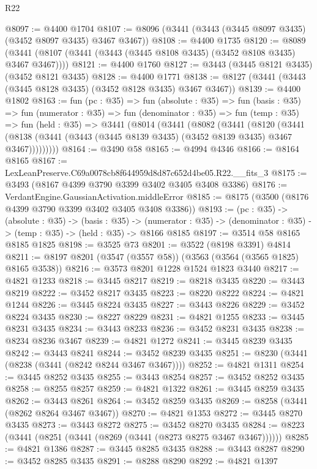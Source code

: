 \begin{lexlean}{R22}
\begin{coremodule}
@8097 := @4400 @1704
@8107 := @8096 (@3441 (@3443 (@3445 @8097 @3435) (@3452 @8097 @3435) @3467 @3467))
@8108 := @4400 @1735
@8120 := @8089 (@3441 (@8107 (@3441 (@3443 (@3445 @8108 @3435) (@3452 @8108 @3435) @3467 @3467))))
@8121 := @4400 @1760
@8127 := @3443 (@3445 @8121 @3435) (@3452 @8121 @3435)
@8128 := @4400 @1771
@8138 := @8127 (@3441 (@3443 (@3445 @8128 @3435) (@3452 @8128 @3435) @3467 @3467))
@8139 := @4400 @1802
@8163 := fun (pc : @35) =>
  fun (absolute : @35) =>
  fun (basis : @35) =>
  fun (numerator : @35) =>
  fun (denominator : @35) =>
  fun (temp : @35) =>
  fun (held : @35) =>
  @3441
    (@8014
      (@3441
        (@8082
          (@3441
            (@8120
              (@3441
                (@8138 (@3441 (@3443 (@3445 @8139 @3435) (@3452 @8139 @3435) @3467 @3467)))))))))
@8164 := @3490 @58
@8165 := @4994 @4346
@8166 := @8164 @8165
@8167 := LexLeanPreserve.C69a0078cb8f644959d8d87c652d4be05.R22.__fits_3
@8175 := @3493 (@8167 @4399 @3790 @3399 @3402 @3405 @3408 @3386)
@8176 := VerdantEngine.GaussianActivation.middleError
@8185 := @8175 (@3500 (@8176 @4399 @3790 @3399 @3402 @3405 @3408 @3386))
@8193 := (pc : @35) ->
  (absolute : @35) ->
  (basis : @35) ->
  (numerator : @35) -> (denominator : @35) -> (temp : @35) -> (held : @35) -> @8166 @8185
@8197 := @3514 @58 @8165 @8185 @1825
@8198 := @3525 @73
@8201 := @3522 (@8198 @3391) @4814
@8211 := @8197 @8201 (@3547 (@3557 @58)) (@3563 (@3564 (@3565 @1825) @8165 @3538))
@8216 := @3573 @8201 @1228 @1524 @1823 @3440
@8217 := @4821 @1233
@8218 := @3445 @8217
@8219 := @8218 @3435
@8220 := @3443 @8219
@8222 := @3452 @8217 @3435
@8223 := @8220 @8222
@8224 := @4821 @1244
@8226 := @3445 @8224 @3435
@8227 := @3443 @8226
@8229 := @3452 @8224 @3435
@8230 := @8227 @8229
@8231 := @4821 @1255
@8233 := @3445 @8231 @3435
@8234 := @3443 @8233
@8236 := @3452 @8231 @3435
@8238 := @8234 @8236 @3467
@8239 := @4821 @1272
@8241 := @3445 @8239 @3435
@8242 := @3443 @8241
@8244 := @3452 @8239 @3435
@8251 := @8230 (@3441 (@8238 (@3441 (@8242 @8244 @3467 @3467))))
@8252 := @4821 @1311
@8254 := @3445 @8252 @3435
@8255 := @3443 @8254
@8257 := @3452 @8252 @3435
@8258 := @8255 @8257
@8259 := @4821 @1322
@8261 := @3445 @8259 @3435
@8262 := @3443 @8261
@8264 := @3452 @8259 @3435
@8269 := @8258 (@3441 (@8262 @8264 @3467 @3467))
@8270 := @4821 @1353
@8272 := @3445 @8270 @3435
@8273 := @3443 @8272
@8275 := @3452 @8270 @3435
@8284 := @8223 (@3441 (@8251 (@3441 (@8269 (@3441 (@8273 @8275 @3467 @3467))))))
@8285 := @4821 @1386
@8287 := @3445 @8285 @3435
@8288 := @3443 @8287
@8290 := @3452 @8285 @3435
@8291 := @8288 @8290
@8292 := @4821 @1397

\end{coremodule}
\end{lexlean}
